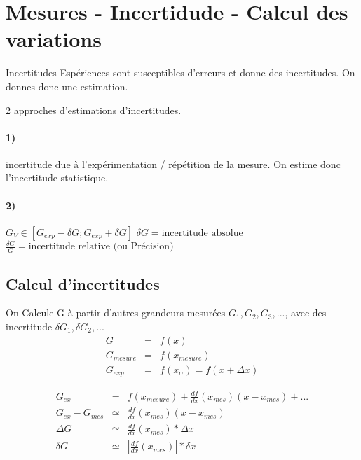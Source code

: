 \section{Mesures - Incertidude - Calcul des variations}{Incertitudes}
Espériences sont susceptibles d'erreurs et donne des incertitudes. On donnes donc une estimation.

2 approches d'estimations d'incertitudes. 
\paragraph{1)} incertitude due à l'expérimentation / répétition de la mesure. On estime donc l'incertitude statistique.
\paragraph{2)} $G_V \in [G_{exp} - \delta G ; G_{exp} + \delta G]$
$\delta G = \text{incertitude absolue}$~\\
$\frac{\delta G}{G} = \text{incertitude relative (ou Précision)}$

\subsection{Calcul d'incertitudes} On Calcule G à partir d'autres grandeurs mesurées $G_1, G_2, G_3, ...$, avec des incertitude $\delta G_1, \delta G_2, ...$
\begin{align*}
	G & = & f(x) \\
	G_{mesure} & = & f(x_{mesure}) \\
	G_{exp} & = & f(x_\alpha) = f(x + \Delta x)
\end{align*}


\begin{align}
	G_{ex} & = & f(x_{mesure}) + \frac{df}{dx} (x_{mes}) (x-x_{mes}) + ... \\ 
	G_{ex} - G_{mes} & \simeq & \frac{df}{dx}(x_{mes})(x-x_{mes}) \\
	\Delta G & \simeq & \frac{df}{dx}(x_{mes}) * \Delta x \\
	\delta G & \simeq & |\frac{df}{dx}(x_{mes})| * \delta x
\end{align}

